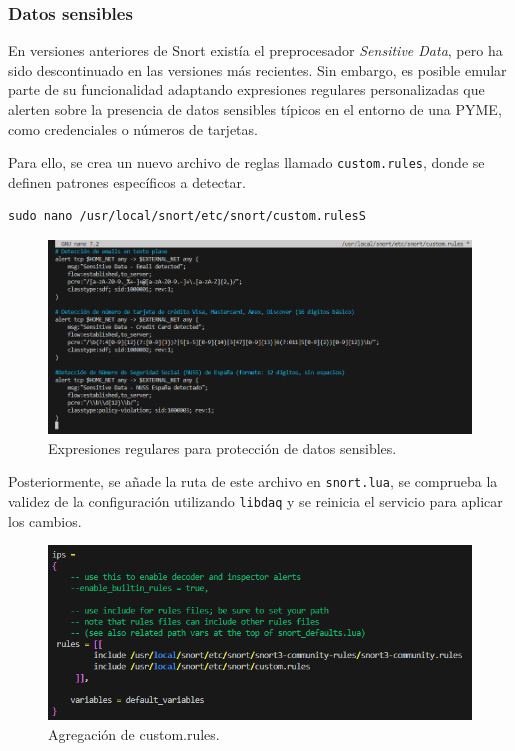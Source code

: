\documentclass[11pt,a4paper,twoside]{report}
\begin{document}
\subsubsection*{Datos sensibles}

En versiones anteriores de Snort existía el preprocesador \textit{Sensitive Data}, pero ha sido descontinuado en las versiones más recientes. Sin embargo, es posible emular parte de su funcionalidad adaptando expresiones regulares personalizadas que alerten sobre la presencia de datos sensibles típicos en el entorno de una PYME, como credenciales o números de tarjetas.\newline

Para ello, se crea un nuevo archivo de reglas llamado \texttt{custom.rules}, donde se definen patrones específicos a detectar.

\begin{lstlisting}[style=commandstyle, caption={Editando el archivo custom.rules para incluir reglas personalizadas}]
	sudo nano /usr/local/snort/etc/snort/custom.rulesS
\end{lstlisting}


\begin{figure}[H]
	\centering
	\includegraphics[scale=0.6]{sensitive/1.png}
	\caption{Expresiones regulares para protección de datos sensibles.}
\end{figure}

Posteriormente, se añade la ruta de este archivo en \texttt{snort.lua}, se comprueba la validez de la configuración utilizando \texttt{libdaq} y se reinicia el servicio para aplicar los cambios.

\begin{figure}[H]
	\centering
	\includegraphics[scale=0.6]{sensitive/2.png}
	\caption{Agregación de custom.rules.}
\end{figure}
\end{document}
